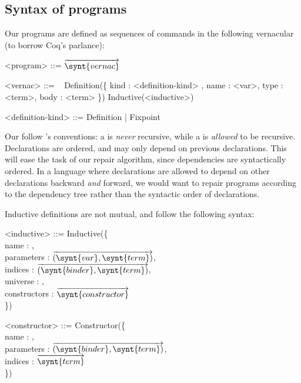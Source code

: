 \subsection{Syntax of \Chick{} programs}\label{chick-syntax-programs}

Our programs are defined as sequences of commands in the following vernacular
(to borrow Coq's parlance):

\begin{grammar}
<program> ::= $\overrightarrow{ \synt{vernac} }$

<vernac> ::= \ %
\alt Definition(\{ kind : <definition-kind> , name : <var>, type : <term>, body : <term> \})
\alt Inductive(<inductive>)

<definition-kind> ::= Definition | Fixpoint
\end{grammar}

Our  follow \Coq{}'s \Vernacular{} conventions: a
 is \emph{never} recursive, while a 
is \emph{allowed} to be recursive.  Declarations are ordered, and may only
depend on previous declarations.  This will ease the task of our repair
algorithm, since dependencies are syntactically ordered.  In a language where
declarations are allowed to depend on other declarations backward \emph{and}
forward, we would want to repair programs according to the dependency tree
rather than the syntactic order of declarations.

Inductive definitions are not mutual, and follow the following syntax:

\noindent
\begin{grammar}
<inductive> ::= Inductive(\{\\
name : ,\\
parameters : $\overrightarrow{ ( \synt{var} , \synt{term} ) }$,\\
indices : $\overrightarrow{ ( \synt{binder} , \synt{term} ) }$,\\
universe : ,\\
constructors : $\overrightarrow{ \synt{constructor} }$\\
\})

<constructor> ::= Constructor(\{\\
name : ,\\
parameters : $\overrightarrow{ ( \synt{binder}, \synt{term} ) }$,\\
indices : $\overrightarrow{ \synt{term} }$\\
\})
\end{grammar}
\vspace{\baselineskip}
